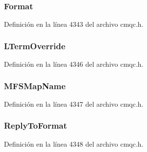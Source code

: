\subsubsection[{Format}]{ Format}\label{structtag_m_q_i_i_h_a435a478822008713f8aaff89f369ed63}


Definición en la línea 4343 del archivo cmqc.\+h.

\hypertarget{structtag_m_q_i_i_h_a6234d3d27d3b6ffe0efc51f8bd845f79}{}
\subsubsection[{L\+Term\+Override}]{ L\+Term\+Override}\label{structtag_m_q_i_i_h_a6234d3d27d3b6ffe0efc51f8bd845f79}


Definición en la línea 4346 del archivo cmqc.\+h.

\hypertarget{structtag_m_q_i_i_h_a1737f092f5f03c7344e8d83c8eace01b}{}
\subsubsection[{M\+F\+S\+Map\+Name}]{ M\+F\+S\+Map\+Name}\label{structtag_m_q_i_i_h_a1737f092f5f03c7344e8d83c8eace01b}


Definición en la línea 4347 del archivo cmqc.\+h.

\hypertarget{structtag_m_q_i_i_h_aa0db77dc6a13de85785fa6cde04cb9ec}{}
\subsubsection[{Reply\+To\+Format}]{ Reply\+To\+Format}\label{structtag_m_q_i_i_h_aa0db77dc6a13de85785fa6cde04cb9ec}


Definición en la línea 4348 del archivo cmqc.\+h.

\hypertarget{structtag_m_q_i_i_h_a46c61c67b777dd2428e34fa6f407bef3}{}
